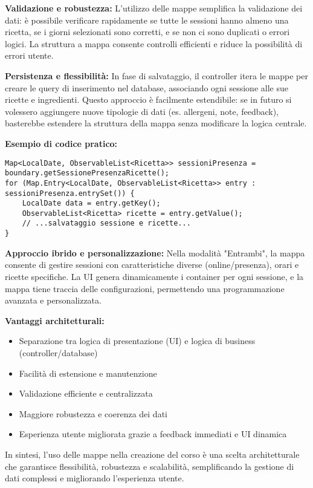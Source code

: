 \textbf{Validazione e robustezza:} L'utilizzo delle mappe semplifica la validazione dei dati: è possibile verificare rapidamente se tutte le sessioni hanno almeno una ricetta, se i giorni selezionati sono corretti, e se non ci sono duplicati o errori logici. La struttura a mappa consente controlli efficienti e riduce la possibilità di errori utente.

\textbf{Persistenza e flessibilità:} In fase di salvataggio, il controller itera le mappe per creare le query di inserimento nel database, associando ogni sessione alle sue ricette e ingredienti. Questo approccio è facilmente estendibile: se in futuro si volessero aggiungere nuove tipologie di dati (es. allergeni, note, feedback), basterebbe estendere la struttura della mappa senza modificare la logica centrale.

\textbf{Esempio di codice pratico:}
\begin{verbatim}
Map<LocalDate, ObservableList<Ricetta>> sessioniPresenza = boundary.getSessionePresenzaRicette();
for (Map.Entry<LocalDate, ObservableList<Ricetta>> entry : sessioniPresenza.entrySet()) {
    LocalDate data = entry.getKey();
    ObservableList<Ricetta> ricette = entry.getValue();
    // ...salvataggio sessione e ricette...
}
\end{verbatim}

\textbf{Approccio ibrido e personalizzazione:} Nella modalità "Entrambi", la mappa consente di gestire sessioni con caratteristiche diverse (online/presenza), orari e ricette specifiche. La UI genera dinamicamente i container per ogni sessione, e la mappa tiene traccia delle configurazioni, permettendo una programmazione avanzata e personalizzata.

\textbf{Vantaggi architetturali:}
\begin{itemize}
    \item Separazione tra logica di presentazione (UI) e logica di business (controller/database)
    \item Facilità di estensione e manutenzione
    \item Validazione efficiente e centralizzata
    \item Maggiore robustezza e coerenza dei dati
    \item Esperienza utente migliorata grazie a feedback immediati e UI dinamica
\end{itemize}

In sintesi, l'uso delle mappe nella creazione del corso è una scelta architetturale che garantisce flessibilità, robustezza e scalabilità, semplificando la gestione di dati complessi e migliorando l'esperienza utente.

